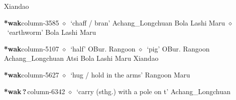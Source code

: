 \hspace{1ex}
         Xiandao 
  \item {\footnotesize \textbf{*wak}}{\tiny column-3585}
         $\diamond$~`chaff / bran'
         Achang\_Longchuan 
\hspace{1ex}
         Bola 
\hspace{1ex}
         Lashi 
\hspace{1ex}
         Maru 
\hspace{1ex}
         $\diamond$~`earthworm'
         Bola 
\hspace{1ex}
         Lashi 
\hspace{1ex}
         Maru 
  \item {\footnotesize \textbf{*wak}}{\tiny column-5107}
         $\diamond$~`half'
         OBur. 
\hspace{1ex}
         Rangoon 
\hspace{1ex}
         $\diamond$~`pig'
         OBur. 
\hspace{1ex}
         Rangoon 
\hspace{1ex}
         Achang\_Longchuan 
\hspace{1ex}
         Atsi 
\hspace{1ex}
         Bola 
\hspace{1ex}
         Lashi 
\hspace{1ex}
         Maru 
\hspace{1ex}
         Xiandao 
  \item {\footnotesize \textbf{*wak}}{\tiny column-5627}
         $\diamond$~`hug / hold in the arms'
         Rangoon 
\hspace{1ex}
         Maru 
  \item {\footnotesize \textbf{*wak\,?\,}}{\tiny column-6342}
         $\diamond$~`carry (sthg.) with a pole on t'
         Achang\_Longchuan 
\hspace{1ex}
